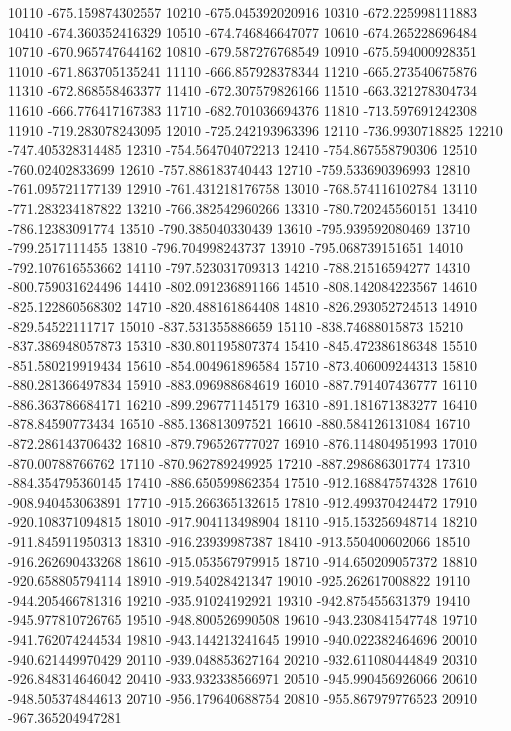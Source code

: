 {10110 -675.159874302557
10210 -675.045392020916
10310 -672.225998111883
10410 -674.360352416329
10510 -674.746846647077
10610 -674.265228696484
10710 -670.965747644162
10810 -679.587276768549
10910 -675.594000928351
11010 -671.863705135241
11110 -666.857928378344
11210 -665.273540675876
11310 -672.868558463377
11410 -672.307579826166
11510 -663.321278304734
11610 -666.776417167383
11710 -682.701036694376
11810 -713.597691242308
11910 -719.283078243095
12010 -725.242193963396
12110 -736.9930718825
12210 -747.405328314485
12310 -754.564704072213
12410 -754.867558790306
12510 -760.02402833699
12610 -757.886183740443
12710 -759.533690396993
12810 -761.095721177139
12910 -761.431218176758
13010 -768.574116102784
13110 -771.283234187822
13210 -766.382542960266
13310 -780.720245560151
13410 -786.12383091774
13510 -790.385040330439
13610 -795.939592080469
13710 -799.2517111455
13810 -796.704998243737
13910 -795.068739151651
14010 -792.107616553662
14110 -797.523031709313
14210 -788.21516594277
14310 -800.759031624496
14410 -802.091236891166
14510 -808.142084223567
14610 -825.122860568302
14710 -820.488161864408
14810 -826.293052724513
14910 -829.54522111717
15010 -837.531355886659
15110 -838.74688015873
15210 -837.386948057873
15310 -830.801195807374
15410 -845.472386186348
15510 -851.580219919434
15610 -854.004961896584
15710 -873.406009244313
15810 -880.281366497834
15910 -883.096988684619
16010 -887.791407436777
16110 -886.363786684171
16210 -899.296771145179
16310 -891.181671383277
16410 -878.84590773434
16510 -885.136813097521
16610 -880.584126131084
16710 -872.286143706432
16810 -879.796526777027
16910 -876.114804951993
17010 -870.00788766762
17110 -870.962789249925
17210 -887.298686301774
17310 -884.354795360145
17410 -886.650599862354
17510 -912.168847574328
17610 -908.940453063891
17710 -915.266365132615
17810 -912.499370424472
17910 -920.108371094815
18010 -917.904113498904
18110 -915.153256948714
18210 -911.845911950313
18310 -916.23939987387
18410 -913.550400602066
18510 -916.262690433268
18610 -915.053567979915
18710 -914.650209057372
18810 -920.658805794114
18910 -919.54028421347
19010 -925.262617008822
19110 -944.205466781316
19210 -935.91024192921
19310 -942.875455631379
19410 -945.977810726765
19510 -948.800526990508
19610 -943.230841547748
19710 -941.762074244534
19810 -943.144213241645
19910 -940.022382464696
20010 -940.621449970429
20110 -939.048853627164
20210 -932.611080444849
20310 -926.848314646042
20410 -933.932338566971
20510 -945.990456926066
20610 -948.505374844613
20710 -956.179640688754
20810 -955.867979776523
20910 -967.365204947281
}

